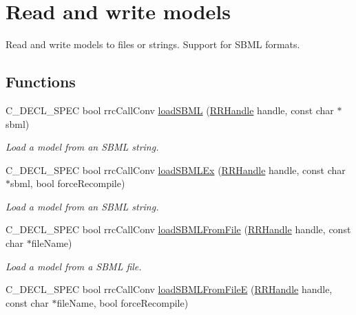 \hypertarget{group__loadsave}{\section{Read and write models}
\label{group__loadsave}
}


Read and write models to files or strings. Support for S\-B\-M\-L formats.  


\subsection*{Functions}
\begin{DoxyCompactItemize}
\item 
C\-\_\-\-D\-E\-C\-L\-\_\-\-S\-P\-E\-C bool rrc\-Call\-Conv \hyperlink{group__loadsave_gaeaaaf4f7855457d6207934149f52f5f9}{load\-S\-B\-M\-L} (\hyperlink{rrc__types_8h_a1d68f0592372208fa5a5f2799ea4b3ae}{R\-R\-Handle} handle, const char $\ast$sbml)
\begin{DoxyCompactList}\small\item\em Load a model from an S\-B\-M\-L string. \end{DoxyCompactList}\item 
C\-\_\-\-D\-E\-C\-L\-\_\-\-S\-P\-E\-C bool rrc\-Call\-Conv \hyperlink{group__loadsave_ga255d17e06e104da6a2f9e0696b1aa9e3}{load\-S\-B\-M\-L\-Ex} (\hyperlink{rrc__types_8h_a1d68f0592372208fa5a5f2799ea4b3ae}{R\-R\-Handle} handle, const char $\ast$sbml, bool force\-Recompile)
\begin{DoxyCompactList}\small\item\em Load a model from an S\-B\-M\-L string. \end{DoxyCompactList}\item 
C\-\_\-\-D\-E\-C\-L\-\_\-\-S\-P\-E\-C bool rrc\-Call\-Conv \hyperlink{group__loadsave_ga03cb924c6790b039f77a1a9c5dbcdda1}{load\-S\-B\-M\-L\-From\-File} (\hyperlink{rrc__types_8h_a1d68f0592372208fa5a5f2799ea4b3ae}{R\-R\-Handle} handle, const char $\ast$file\-Name)
\begin{DoxyCompactList}\small\item\em Load a model from a S\-B\-M\-L file. \end{DoxyCompactList}\item 
C\-\_\-\-D\-E\-C\-L\-\_\-\-S\-P\-E\-C bool rrc\-Call\-Conv \hyperlink{group__loadsave_gab2aa4b93a3037879a0da7dc85b3a9746}{load\-S\-B\-M\-L\-From\-File\-E} (\hyperlink{rrc__types_8h_a1d68f0592372208fa5a5f2799ea4b3ae}{R\-R\-Handle} handle, const char $\ast$file\-Name, bool force\-Recompile)

\end{DoxyCompactItemize}
